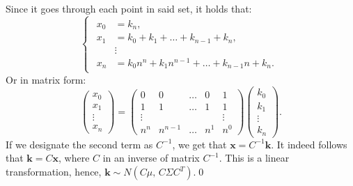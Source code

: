 \documentclass[14pt,a4paper]{extarticle}
\begin{document}
	Since it goes through each point in said set, it holds that:
	\begin{equation*}
		\begin{cases}
			\begin{aligned}
				x_0 &= k_n,\\
				x_1 &= k_0+k_1+\dots+k_{n-1}+k_{n},\\
				& \vdots\\
				x_n &= k_0n^{n}+k_1n^{n-1}+\dots+k_{n-1}n+k_{n}.
			\end{aligned}
		\end{cases}
	\end{equation*}
	Or in matrix form:
	\[\begin{pmatrix}x_0\\x_1\\\vdots\\x_n\end{pmatrix}=\begin{pmatrix}0&0&\dots&0&1\\1&1&\dots&1&1\\\vdots&&&&\vdots\\n^n&n^{n-1}&\dots&n^1&n^0\end{pmatrix}\begin{pmatrix}k_{0}\\k_{1}\\\vdots\\k_{n}\end{pmatrix}.\]
	If we designate the second term as $C^{-1}$, we get that $\bm{x}=C^{-1}\bm{k}$. It indeed follows that $\bm{k}=C\bm{x}$, where $C$ in an inverse of matrix $C^{-1}$. This is a linear transformation, hence, $\bm{k} \sim N(C\mu,\, C\Sigma C^T)$.\qed
\end{document}
